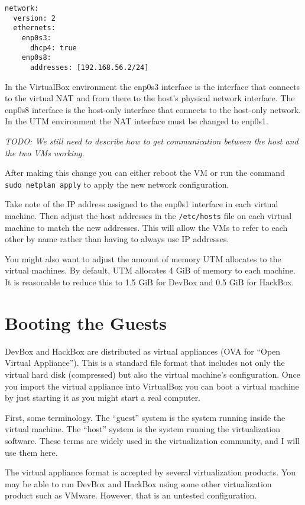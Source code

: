 \documentclass{article}
\newcommand{\command}[1]{\texttt{#1}}
\newcommand{\filename}[1]{\texttt{#1}}
\newcommand{\todo}[1]{\textit{TODO: #1}}
\begin{document}
\begin{Verbatim}
network:
  version: 2
  ethernets:
    enp0s3:
      dhcp4: true
    enp0s8:
      addresses: [192.168.56.2/24]
\end{Verbatim}

In the VirtualBox environment the enp0s3 interface is the interface that connects to the virtual
NAT and from there to the host's physical network interface. The enp0s8 interface is the
host-only interface that connects to the host-only network. In the UTM environment the NAT
interface must be changed to enp0s1.

\todo{We still need to describe how to get communication between the host and the two VMs working.}

After making this change you can either reboot the VM or run the command \command{sudo netplan
apply} to apply the new network configuration.

Take note of the IP address assigned to the enp0s1 interface in each virtual machine. Then
adjust the host addresses in the \filename{/etc/hosts} file on each virtual machine to match the
new addresses. This will allow the VMs to refer to each other by name rather than having to
always use IP addresses.

You might also want to adjust the amount of memory UTM allocates to the virtual machines. By
default, UTM allocates 4 GiB of memory to each machine. It is reasonable to reduce this to 1.5
GiB for DevBox and 0.5 GiB for HackBox.

\section{Booting the Guests}
\label{sec:booting-guests}

DevBox and HackBox are distributed as virtual appliances (OVA for ``Open Virtual Appliance'').
This is a standard file format that includes not only the virtual hard disk (compressed) but
also the virtual machine's configuration. Once you import the virtual appliance into VirtualBox
you can boot a virtual machine by just starting it as you might start a real computer.

First, some terminology. The ``guest'' system is the system running inside the virtual machine.
The ``host'' system is the system running the virtualization software. These terms are widely
used in the virtualization community, and I will use them here.

The virtual appliance format is accepted by several virtualization products. You may be able to
run DevBox and HackBox using some other virtualization product such as VMware. However, that is
an untested configuration.
\end{document}
